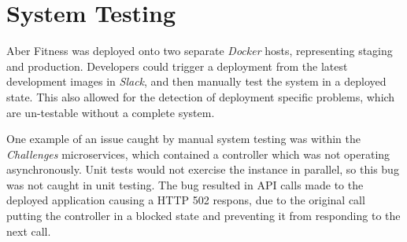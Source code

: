 \section{System Testing}
\par
Aber Fitness was deployed onto two separate \textit{Docker} hosts, representing staging and production. Developers could trigger a deployment from the latest development images in \textit{Slack}, and then manually test the system in a deployed state. This also allowed for the detection of deployment specific problems, which are un-testable without a complete system.

\par
One example of an issue caught by manual system testing was within the \textit{Challenges} microservices, which contained a controller which was not operating asynchronously. Unit tests would not exercise the instance in parallel, so this bug was not caught in unit testing. The bug resulted in API calls made to the deployed application causing a HTTP 502 respons, due to the original call putting the controller in a blocked state and preventing it from responding to the next call.
